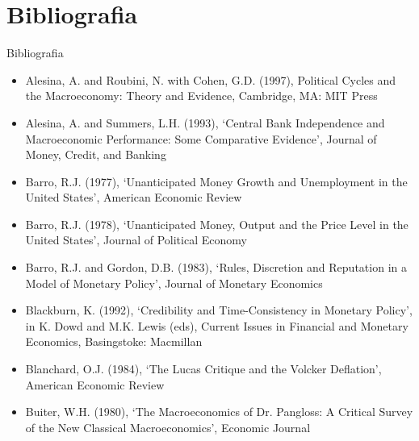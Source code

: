 \documentclass[10pt]{beamer}
\begin{document}
\section{Bibliografia}
\begin{frame}{ Bibliografia}
    \begin{itemize}                        
        \item Alesina, A. and Roubini, N. with Cohen, G.D. (1997), Political Cycles and the Macroeconomy: Theory and Evidence, Cambridge, MA: MIT Press\medskip
        \item Alesina, A. and Summers, L.H. (1993), ‘Central Bank Independence and Macroeconomic Performance: Some Comparative Evidence’, Journal of Money, Credit, and Banking\medskip
        \item Barro, R.J. (1977), ‘Unanticipated Money Growth and Unemployment in the United States’, American Economic Review\medskip
        \item Barro, R.J. (1978), ‘Unanticipated Money, Output and the Price Level in the United States’, Journal of Political Economy\medskip
        \item Barro, R.J. and Gordon, D.B. (1983), ‘Rules, Discretion and Reputation in a Model of Monetary Policy’, Journal of Monetary Economics\medskip
        \item Blackburn, K. (1992), ‘Credibility and Time-Consistency in Monetary Policy’, in K. Dowd and M.K. Lewis (eds), Current Issues in Financial and Monetary Economics, Basingstoke: Macmillan\medskip
        \item Blanchard, O.J. (1984), ‘The Lucas Critique and the Volcker Deflation’, American Economic Review\medskip
        \item Buiter, W.H. (1980), ‘The Macroeconomics of Dr. Pangloss: A Critical Survey of the New Classical Macroeconomics’, Economic Journal\medskip        
    \end{itemize}
\end{frame}
\end{document}
